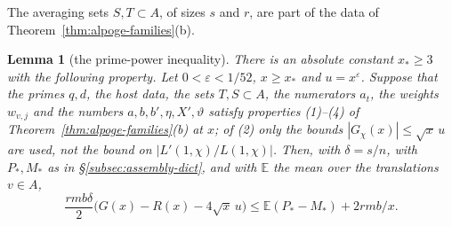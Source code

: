 \documentclass[10pt]{amsart}
\newtheorem{lemma}[theorem]{Lemma}
\theoremstyle{definition}
\theoremstyle{remark}
\begin{document}
The averaging sets $S,T\subset A$, of sizes $s$ and $r$, are part of the
data of Theorem~\ref{thm:alpoge-families}(b).

\begin{lemma}[the prime-power inequality]\label{lem:prime-power}
There is an absolute constant $x_*\ge3$ with the following property. Let
$0<\varepsilon<1/52$, $x\ge x_*$ and $u=x^\varepsilon$. Suppose that the
primes $q,d$, the host data, the sets $T,S\subset A$, the numerators
$a_t$, the weights $w_{v,j}$ and the numbers $a,b,b',\eta,X',\vartheta$
satisfy properties (1)--(4) of Theorem~\ref{thm:alpoge-families}(b) at $x$;
of (2) only the bounds $|G_\chi(x)|\le\sqrt x\,u$ are used, not the bound
on $|L'(1,\chi)/L(1,\chi)|$. Then, with $\delta=s/n$, with $P_*,M_*$ as in
\S\ref{subsec:assembly-dict}, and with $\mathbb E$ the mean over the
translations $v\in A$,
\begin{equation}\label{eq:prime-power}
 \frac{rmb\delta}{2}\bigl(G(x)-R(x)-4\sqrt{x}\,u\bigr)
 \le \mathbb E(P_*-M_*)+2rmb/x .
\end{equation}
\end{lemma}
\end{document}
